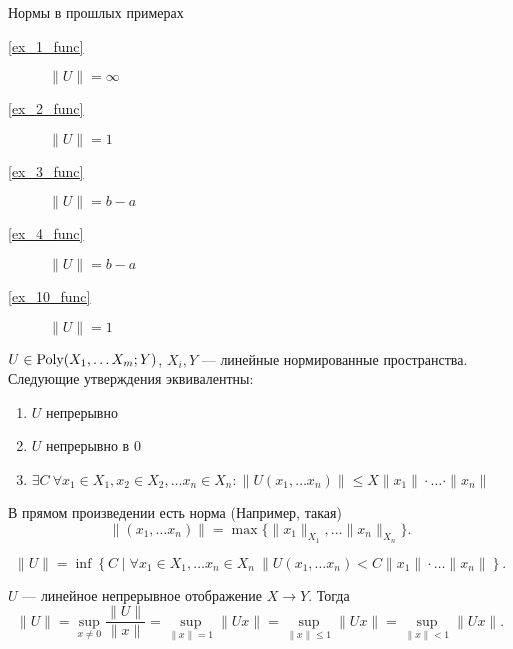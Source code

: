 \begin{ex}
    Нормы в прошлых примерах
    \begin{description}
	\item[\ref{ex_1_func}] $ \| U \|  = \infty$
	\item[\ref{ex_2_func}] $ \| U \|  = 1$
	\item[\ref{ex_3_func}] $ \| U \| = b-a$
	\item[\ref{ex_4_func}] $ \| U \| = b-a$
	    \item[\ref{ex_10_func}] $ \| U \|  = 1$
    \end{description}
\end{ex}
\begin{thm}
    $ U \in  {\mathop{\text{\rm Poly}}}(X_1, \ldots X_m; Y)$, $X_i, Y  $ --- линейные нормированные пространства. Следующие утверждения эквивалентны:
    \begin{enumerate}
        \item $ U$ непрерывно
	    \item  $ U$ непрерывно в $ 0$ 
	    \item  $ \exists  C ~ \forall  x_1 \in X_1, x_2 \in X_2, \ldots x_n \in X_n \colon \| U(x_1, \ldots x_n) \|  \le  X \| x_1 \| \cdot \ldots \cdot \| x_{n} \| $
    \end{enumerate}
    \begin{note}
	В прямом произведении есть норма (Например, такая) \[
	    \| (x_1, \ldots  x_{n})\| = \max \{\| x_1 \| _{X_1} , \ldots  \| x_{n} \| _{   X_n}\} 
        .\] 
    \end{note}
\end{thm}
\begin{defn}
    \[
	\| U \|  = \inf \left\{ C \mid \forall  x_1 \in X_1, \ldots x_{n} \in X_n ~ \|  U(x_1, \ldots x_{n}) < C \| x_1 \| \cdot \ldots \| x_{n} \|    \right\} 
    .\] 
\end{defn}
\begin{thm} 		
    $ U$ --- линейное непрерывное отображение $ X \to  Y$. Тогда
    \[
	\| U \| = \sup_{x\ne 0 }\frac{\| U \| }{\| x \| } = \sup_{\| x \| =1} \|  Ux \| = \sup_{\| x \|  \le 1} \| Ux \| = \sup_{\|  x \| < 1} \| Ux \|  
    .\] 
\end{thm}
